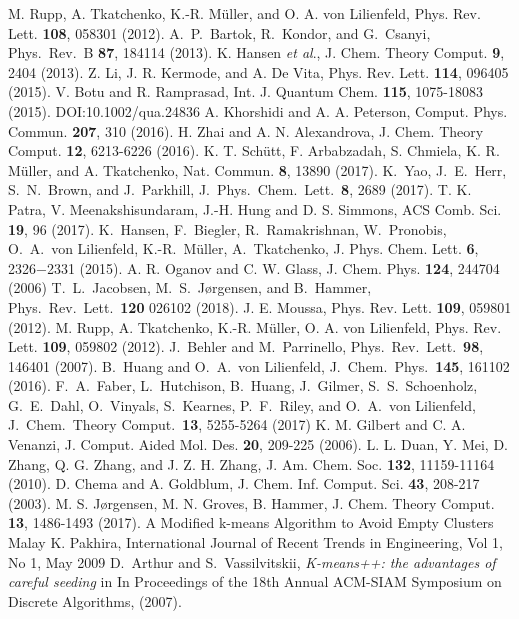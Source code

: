 \documentclass[aip,amsmath,amssymb,reprint]{revtex4-1}
\begin{document}
\begin{thebibliography}{12}
 M. Rupp, A. Tkatchenko, K.-R. M\"{u}ller, and O. A. von Lilienfeld, Phys. Rev. Lett. \textbf{108}, 058301 (2012). 
 A.\ P.\ Bartok, R.\ Kondor, and G.\ Csanyi, Phys.\ Rev.\ B \textbf{87}, 184114 (2013).
K. Hansen \textit{et al}., J. Chem. Theory Comput. \textbf{9}, 2404 (2013).
Z. Li, J. R. Kermode, and A. De Vita, Phys. Rev. Lett. \textbf{114}, 096405 (2015).
 V. Botu and R. Ramprasad, Int. J. Quantum Chem. \textbf{115}, 1075-18083 (2015). DOI:10.1002/qua.24836 
A. Khorshidi and A. A. Peterson, Comput. Phys. Commun. \textbf{207}, 310 (2016).
H. Zhai and A. N. Alexandrova, J. Chem. Theory Comput. \textbf{12}, 6213-6226 (2016).
K. T. Sch\"{u}tt, F. Arbabzadah, S. Chmiela, K. R. M\"{u}ller, and A. Tkatchenko, Nat. Commun. \textbf{8}, 13890 (2017).
K.\ Yao, J.\ E.\ Herr, S.\ N.\ Brown, and J.\ Parkhill, J.\ Phys.\ Chem.\ Lett.\ \textbf{8}, 2689 (2017).
T. K. Patra, V. Meenakshisundaram, J.-H. Hung and D. S. Simmons, ACS Comb. Sci. \textbf{19}, 96 (2017).
K.\ Hansen, F.\ Biegler, R.\ Ramakrishnan, W.\ Pronobis, O.\ A.\ von Lilienfeld, K.-R.\ M{\"u}ller, A.\ Tkatchenko, J. Phys. Chem. Lett. \textbf{6}, 2326−2331 (2015).
A. R. Oganov and C. W. Glass, J. Chem. Phys. \textbf{124}, 244704 (2006)
T.\ L.\ Jacobsen, M.\ S.\ J{\o}rgensen, and B.\ Hammer, Phys.\ Rev.\ Lett.\ \textbf{120} 026102 (2018).
 J. E. Moussa, Phys. Rev. Lett. \textbf{109}, 059801 (2012).
M. Rupp, A. Tkatchenko, K.-R. M{\"u}ller, O. A. von Lilienfeld, Phys. Rev. Lett. \textbf{109}, 059802 (2012).
J.\ Behler and M.\ Parrinello, Phys.\ Rev.\ Lett.\ \textbf{98}, 146401 (2007).
B.\ Huang and O.\ A.\ von Lilienfeld, J.\ Chem.\ Phys.\ \textbf{145}, 161102 (2016).
F.\ A.\ Faber, L.\ Hutchison, B.\ Huang, J.\ Gilmer, S.\ S.\ Schoenholz, G.\ E.\ Dahl, O.\ Vinyals, S.\ Kearnes, P.\ F.\ Riley, and O.\ A.\ von Lilienfeld, J.\ Chem.\ Theory Comput.\ \textbf{13}, 5255-5264 (2017)
 K. M. Gilbert and C. A. Venanzi, J. Comput. Aided Mol. Des. \textbf{20}, 209-225 (2006).  
 L. L. Duan, Y. Mei, D. Zhang, Q. G. Zhang, and J. Z. H. Zhang, J. Am. Chem. Soc. \textbf{132}, 11159-11164 (2010).
 D. Chema and A. Goldblum, J. Chem. Inf. Comput. Sci. \textbf{43}, 208-217 (2003). 
 M. S. J{\o}rgensen, M. N. Groves, B. Hammer, J. Chem. Theory Comput. \textbf{13}, 1486-1493 (2017). 
 {A Modified k-means Algorithm to Avoid Empty Clusters} Malay K. Pakhira, International Journal of Recent Trends in Engineering, Vol 1, No 1, May 2009
D.\ Arthur and S.\ Vassilvitskii, \textit{K-means++: the advantages of careful seeding} in
{In Proceedings of the 18th Annual ACM-SIAM Symposium on Discrete Algorithms}, (2007).
\end{thebibliography}
\end{document}
